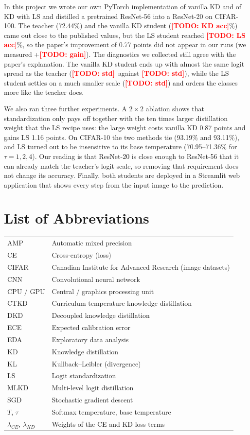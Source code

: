 \documentclass[12pt,a4paper]{article}
\newcommand{\TODO}[1]{\textcolor{red}{\textbf{[TODO: #1]}}}
\newcommand{\KDacc}{\TODO{KD acc}}
\newcommand{\LSacc}{\TODO{LS acc}}
\newcommand{\LSgain}{\TODO{gain}}
\newcommand{\KDlogitstd}{\TODO{std}}
\newcommand{\LSlogitstd}{\TODO{std}}
\newcommand{\Tlogitstd}{\TODO{std}}
\begin{document}
In this project we wrote our own PyTorch implementation of vanilla KD and of KD with LS and distilled a pretrained ResNet-56 into a ResNet-20 on CIFAR-100. The teacher (72.44\%) and the vanilla KD student (\KDacc\%) came out close to the published values, but the LS student reached \LSacc\%, so the paper's improvement of 0.77 points did not appear in our runs (we measured +\LSgain). The diagnostics we collected still agree with the paper's explanation. The vanilla KD student ends up with almost the same logit spread as the teacher (\KDlogitstd\ against \Tlogitstd), while the LS student settles on a much smaller scale (\LSlogitstd) and orders the classes more like the teacher does.

We also ran three further experiments. A $2\times2$ ablation shows that standardization only pays off together with the ten times larger distillation weight that the LS recipe uses: the large weight costs vanilla KD 0.87 points and gains LS 1.16 points. On CIFAR-10 the two methods tie (93.19\% and 93.11\%), and LS turned out to be insensitive to its base temperature (70.95--71.36\% for $\tau=1,2,4$). Our reading is that ResNet-20 is close enough to ResNet-56 that it can already match the teacher's logit scale, so removing that requirement does not change its accuracy. Finally, both students are deployed in a Streamlit web application that shows every step from the input image to the prediction.
\clearpage
\tableofcontents
\clearpage
\listoffigures
\clearpage
\listoftables
\clearpage
\section*{List of Abbreviations}
\begin{tabular}{ll}
AMP & Automatic mixed precision \\
CE & Cross-entropy (loss) \\
CIFAR & Canadian Institute for Advanced Research (image datasets) \\
CNN & Convolutional neural network \\
CPU / GPU & Central / graphics processing unit \\
CTKD & Curriculum temperature knowledge distillation \\
DKD & Decoupled knowledge distillation \\
ECE & Expected calibration error \\
EDA & Exploratory data analysis \\
KD & Knowledge distillation \\
KL & Kullback--Leibler (divergence) \\
LS & Logit standardization \\
MLKD & Multi-level logit distillation \\
SGD & Stochastic gradient descent \\
$T$, $\tau$ & Softmax temperature, base temperature \\
$\lambda_{CE}$, $\lambda_{KD}$ & Weights of the CE and KD loss terms \\
\end{tabular}
\clearpage
{}
\end{document}
